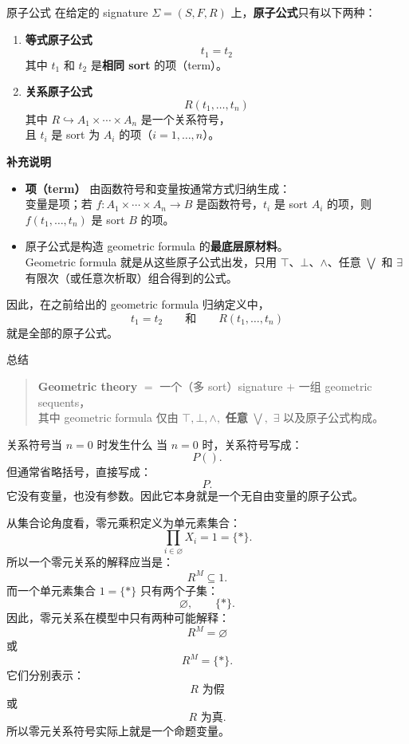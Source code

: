 \documentclass{beamer}
\begin{document}
\begin{frame}[shrink]{原子公式}
在给定的 signature $\Sigma = (S, F, R)$ 上，\textbf{原子公式}只有以下两种：

\begin{enumerate}
    \item \textbf{等式原子公式}
    \[
    t_1 = t_2
    \]
    其中 $t_1$ 和 $t_2$ 是\textbf{相同 sort} 的项（term）。

    \item \textbf{关系原子公式}
    \[
    R(t_1, \dots, t_n)
    \]
    其中 $R \hookrightarrow A_1 \times \cdots \times A_n$ 是一个关系符号，\\
    且 $t_i$ 是 sort 为 $A_i$ 的项（$i = 1, \dots, n$）。
\end{enumerate}

\textbf{补充说明}

\begin{itemize}
    \item \textbf{项（term）} 由函数符号和变量按通常方式归纳生成：\\
    变量是项；若 $f : A_1 \times \cdots \times A_n \to B$ 是函数符号，$t_i$ 是 sort $A_i$ 的项，则 $f(t_1, \dots, t_n)$ 是 sort $B$ 的项。

    \item 原子公式是构造 geometric formula 的\textbf{最底层原材料}。\\
    Geometric formula 就是从这些原子公式出发，只用 $\top$、$\bot$、$\wedge$、任意 $\bigvee$ 和 $\exists$ 有限次（或任意次析取）组合得到的公式。
\end{itemize}

因此，在之前给出的 geometric formula 归纳定义中，
\[
t_1 = t_2 \qquad\text{和}\qquad R(t_1, \dots, t_n)
\]
就是全部的原子公式。
\end{frame}

\begin{frame}{总结}
\begin{quote}
\textbf{Geometric theory} $=$ 一个（多 sort）signature $+$ 一组 geometric sequents，\\
其中 geometric formula 仅由 $\top,\bot,\wedge,$ \textbf{任意} $\bigvee,$ $\exists$ 以及原子公式构成。
\end{quote}
\end{frame}

\begin{frame}[shrink]{关系符号当 $n=0$ 时发生什么}
当 $n=0$ 时，关系符号写成：
\[
P().
\]
但通常省略括号，直接写成：
\[
P.
\]
它没有变量，也没有参数。因此它本身就是一个无自由变量的原子公式。

从集合论角度看，零元乘积定义为单元素集合：
\[
\prod_{i\in\varnothing}X_i=1=\{*\}.
\]
所以一个零元关系的解释应当是：
\[
R^M\subseteq 1.
\]
而一个单元素集合 $1=\{*\}$ 只有两个子集：
\[
\varnothing,\qquad \{*\}.
\]
因此，零元关系在模型中只有两种可能解释：
\[
R^M=\varnothing
\]
或
\[
R^M=\{*\}.
\]
它们分别表示：
\[
R\text{ 为假}
\]
或
\[
R\text{ 为真}.
\]
所以零元关系符号实际上就是一个命题变量。
\end{frame}
\end{document}
